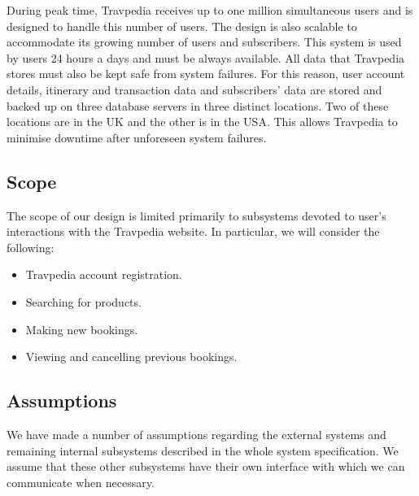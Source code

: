 During peak time, Travpedia receives up to one million simultaneous users and
is designed to handle this number of users. The design is also scalable to
accommodate its growing number of users and subscribers. This system is used
by users 24 hours a days and must be always available. All data that Travpedia
stores must also be kept safe from system failures. For this reason, user
account details, itinerary and transaction data and subscribers' data are
stored and backed up on three database servers in three distinct locations. Two
of these locations are in the UK and the other is in the USA. This allows
Travpedia to minimise downtime after unforeseen system failures.

\subsection{Scope}

The scope of our design is limited primarily to subsystems devoted to user's
interactions with the Travpedia website. In particular, we will consider the
following:

\begin{itemize}
	\item Travpedia account registration.
	\item Searching for products.
	\item Making new bookings.
	\item Viewing and cancelling previous bookings.
\end{itemize}

\subsection{Assumptions}

We have made a number of assumptions regarding the external systems and
remaining internal subsystems described in the whole system specification. We
assume that these other subsystems have their own interface with which we can
communicate when necessary.

